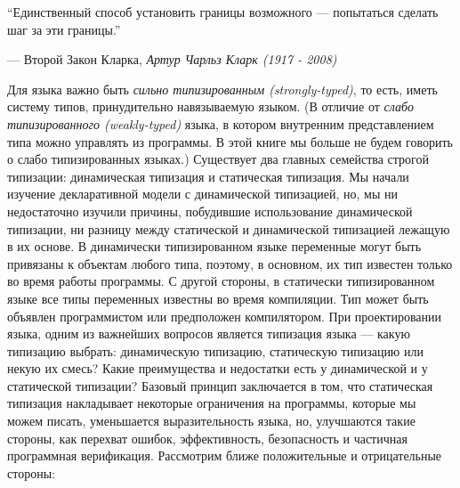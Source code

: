 \epigraph{``Единственный способ установить границы возможного --- попытаться сделать шаг за эти границы.''}{--- Второй Закон Кларка, \emph{Артур Чарльз Кларк (1917 - 2008)}}


Для языка важно быть \emph{сильно типизированным (strongly-typed)}, то есть, иметь систему типов, принудительно навязываемую языком. (В отличие от \emph{слабо типизированного (weakly-typed)} языка, в котором внутренним представлением типа можно управлять из программы. В этой книге мы больше не будем говорить о слабо типизированных языках.) Существует два главных семейства строгой типизации: динамическая типизация и статическая типизация. Мы начали изучение декларативной модели с динамической типизацией, но, мы ни недостаточно изучили причины, побудившие использование динамической типизации, ни разницу между статической и динамической типизацией лежащую в их основе. В динамически типизированном языке переменные могут быть привязаны к объектам любого типа, поэтому, в основном, их тип известен только во время работы программы. С другой стороны, в статически типизированном языке все типы переменных известны во время компиляции. Тип может быть объявлен программистом или предположен компилятором. При проектировании языка, одним из важнейших вопросов является типизация языка --- какую типизацию выбрать: динамическую типизацию, статическую типизацию или некую их смесь? Какие преимущества и недостатки есть у динамической и у статической типизации? Базовый принцип заключается в том, что статическая типизация накладывает некоторые ограничения на программы, которые мы можем писать, уменьшается выразительность языка, но, улучшаются такие стороны, как перехват ошибок, эффективность, безопасность и частичная программная верификация. Рассмотрим ближе положительные и отрицательные стороны:


